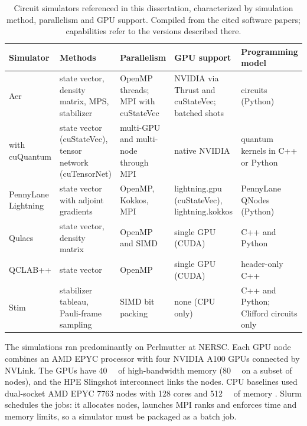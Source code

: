 \begin{table}[htbp]
\caption{Circuit simulators referenced in this dissertation, characterized by simulation method, parallelism and GPU support. Compiled from the cited software papers; capabilities refer to the versions described there.}
\label{tab:bg:simulators}
\centering\footnotesize
\begin{tabularx}{\linewidth}{@{}>{\raggedright\arraybackslash}p{2.6cm}>{\raggedright\arraybackslash}X>{\raggedright\arraybackslash}X>{\raggedright\arraybackslash}X>{\raggedright\arraybackslash}p{2.3cm}@{}}
\toprule
Simulator & Methods & Parallelism & GPU support & Programming model \\
\midrule
\qiskit{} Aer \cite{javadiabhari2024qiskit,doi2023multishotgpu} & state vector, density matrix, MPS, stabilizer & OpenMP threads; MPI with cuStateVec & NVIDIA via Thrust and cuStateVec; batched shots & \qiskit{} circuits (Python) \\
\addlinespace[3pt]
\cudaq{} with cuQuantum \cite{kim2023cudaquantum,bayraktar2023cuquantum} & state vector (cuStateVec), tensor network (cuTensorNet) & multi-GPU and multi-node through MPI & native NVIDIA & quantum kernels in C++ or Python \\
\addlinespace[3pt]
PennyLane Lightning \cite{asadi2024pennylanelightning} & state vector with adjoint gradients & OpenMP, Kokkos, MPI & lightning.gpu (cuStateVec), lightning.kokkos & PennyLane QNodes (Python) \\
\addlinespace[3pt]
Qulacs \cite{suzuki2021qulacs} & state vector, density matrix & OpenMP and SIMD & single GPU (CUDA) & C++ and Python \\
\addlinespace[3pt]
QCLAB++ \cite{vanbeeumen2023qclabpp} & state vector & OpenMP & single GPU (CUDA) & header-only C++ \\
\addlinespace[3pt]
Stim \cite{gidney2021stim} & stabilizer tableau, Pauli-frame sampling & SIMD bit packing & none (CPU only) & C++ and Python; Clifford circuits only \\
\bottomrule
\end{tabularx}
\end{table}

The simulations ran predominantly on Perlmutter at NERSC. Each GPU node combines an AMD EPYC processor with four NVIDIA A100 GPUs connected by NVLink. The GPUs have \SI{40}{\giga\byte} of high-bandwidth memory (\SI{80}{\giga\byte} on a subset of nodes), and the HPE Slingshot interconnect links the nodes. CPU baselines used dual-socket AMD EPYC 7763 nodes with 128 cores and \SI{512}{\giga\byte} of memory \cite{guo2025qgear,choquette2021a100}. Slurm \cite{jette2023slurm} schedules the jobs: it allocates nodes, launches MPI ranks and enforces time and memory limits, so a simulator must be packaged as a batch job.

